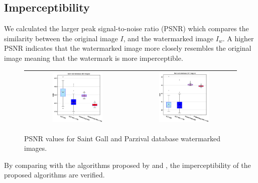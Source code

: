 \documentclass[runningheads]{llncs}
\begin{document}
\subsection{Imperceptibility}
We calculated the larger peak signal-to-noise ratio (PSNR) which compares the similarity between the original image $ I $, and the watermarked image $ I_w $. A higher PSNR indicates that the watermarked image more closely resembles the original image meaning that the watermark is more imperceptible.
\begin{figure}[H]
	\begin{center}
		\begin{tabular}{|c|c|}\hline
			\includegraphics[width=0.5\textwidth]{PSNR_saintgall.eps}
			&\includegraphics[width=0.5\textwidth]{PSNR_parzival.eps}\\\hline
		\end{tabular}
	\end{center}
	\caption{PSNR values for Saint Gall and Parzival database watermarked images.}
	\label{psnr}
\end{figure}

By comparing with the algorithms proposed by \cite{liu2018blind} and \cite{shivani2017dual}, the imperceptibility of the proposed algorithms are verified.
\end{document}
